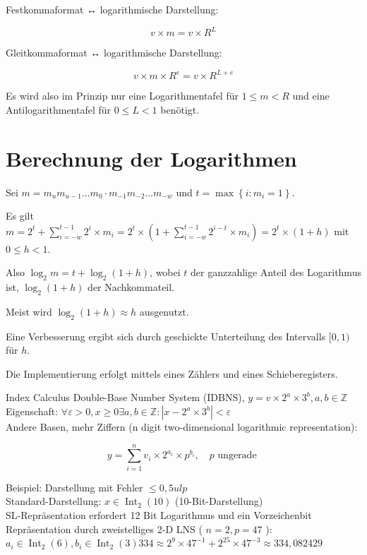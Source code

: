 \documentclass[10pt]{article}
\begin{document}
Festkommaformat ↔ logarithmische Darstellung:

$$
v \times m=v \times R^{L}
$$

Gleitkommaformat ↔ logarithmische Darstellung:

$$
v \times m \times R^{e}=v \times R^{L+e}
$$

Es wird also im Prinzip nur eine Logarithmentafel für $1 \leq m<R$ und eine Antilogarithmentafel für $0 \leq L<1$ benötigt.

\section*{Berechnung der Logarithmen}
Sei $m=m_{u} m_{u-1} \ldots m_{0} \cdot m_{-1} m_{-2} \ldots m_{-w}$ und $t=\max \left\{i: m_{i}=1\right\}$.

Es gilt $m=2^{t}+\sum_{i=-w}^{t-1} 2^{i} \times m_{i}=2^{t} \times\left(1+\sum_{i=-w}^{t-1} 2^{i-t} \times m_{i}\right)=2^{t} \times(1+h)$ mit $0 \leq h<1$.

Also $\log _{2} m=t+\log _{2}(1+h)$, wobei $t$ der ganzzahlige Anteil des Logarithmus ist, $\log _{2}(1+h)$ der Nachkommateil.

Meist wird $\log _{2}(1+h) \approx h$ ausgenutzt.

Eine Verbesserung ergibt sich durch geschickte Unterteilung des Intervalls $[0,1)$ für $h$.

Die Implementierung erfolgt mittels eines Zählers und eines Schieberegisters.

Index Calculus Double-Base Number System (IDBNS), $y=v \times 2^{a} \times 3^{b}, a, b \in \mathbb{Z}$\\
Eigenschaft: $\forall \varepsilon>0, x \geq 0 \exists a, b \in \mathbb{Z}:\left|x-2^{a} \times 3^{b}\right|<\varepsilon$\\
Andere Basen, mehr Ziffern (n digit two-dimensional logarithmic representation):

$$
y=\sum_{i=1}^{n} v_{i} \times 2^{a_{i}} \times p^{b_{i}}, \quad p \text { ungerade }
$$

Beispiel: Darstellung mit Fehler $\leq 0,5 u l p$\\
Standard-Darstellung: $x \in \operatorname{Int}_{2}(10)$ (10-Bit-Darstellung)\\
SL-Repräsentation erfordert 12 Bit Logarithmus und ein Vorzeichenbit\\
Repräsentation durch zweistelliges 2-D LNS ( $n=2, p=47$ ): $a_{i} \in \operatorname{Int}_{2}(6), b_{i} \in \operatorname{Int}_{2}(3) 334 \approx 2^{9} \times 47^{-1}+2^{25} \times 47^{-3} \approx 334,082429$
\end{document}
